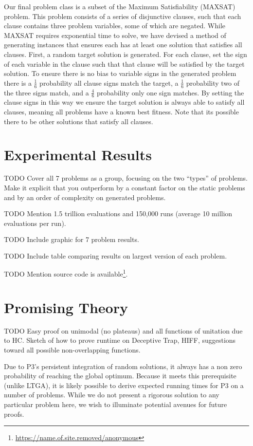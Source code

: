 \documentclass{sig-alternate}
\begin{document}
Our final problem class is a subset of the Maximum Satisfiability (MAXSAT) problem.
This problem consists of a series of disjunctive clauses, such that each clause contains
three problem variables, some of which are negated. While
MAXSAT requires exponential time to solve, we have devised a method of generating
instances that ensures each has at least one solution that satisfies all clauses.
First, a random target solution is generated.  For each clause, set the sign of each
variable in the clause such that that clause will be satisfied by the target solution.
To ensure there is no bias to variable signs in the generated problem there is a $\frac{1}{6}$ probability
all clause signs match the target, a $\frac{1}{6}$ probability two of the three signs match,
and a $\frac{4}{6}$ probability only one sign matches.  By setting the clause signs
in this way we ensure the target solution is always able to satisfy all clauses,
meaning all problems have a known best fitness.  Note that its possible there to be
other solutions that satisfy all clauses.

\section{Experimental Results}
TODO Cover all 7 problems as a group, focusing on the two ``types'' of problems.
Make it explicit that you outperform by a constant factor on the static problems
and by an order of complexity on generated problems.

TODO Mention 1.5 trillion evaluations and 150,000 runs (average 10 million evaluations per run).

TODO Include graphic for 7 problem results.

TODO Include table comparing results on largest version of each problem.

TODO Mention source code is available\footnote{\url{https://name.of.site.removed/anonymous}}.

\section{Promising Theory}
TODO Easy proof on unimodal (no plateaus) and all functions of unitation due to HC.
Sketch of how to prove runtime on Deceptive Trap, HIFF, suggestions toward all
possible non-overlapping functions.

Due to P3's persistent integration of random solutions, it always has a non zero
probability of reaching the global optimum.  Because it meets this prerequisite
(unlike LTGA), it is likely possible to derive expected running times for P3 on
a number of problems.  While we do not present a rigorous solution to any particular
problem here, we wish to illuminate potential avenues for future proofs.
\end{document}
